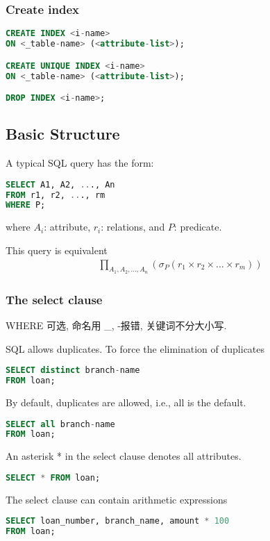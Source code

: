 \subsubsection{Create index}
\begin{lstlisting}[language=sql]
CREATE INDEX <i-name> 
ON <_table-name> (<attribute-list>);

CREATE UNIQUE INDEX <i-name> 
ON <_table-name> (<attribute-list>);

DROP INDEX <i-name>;
\end{lstlisting}

\subsection{Basic Structure}

A typical SQL query has the form:
\begin{lstlisting}[language=sql]
SELECT A1, A2, ..., An
FROM r1, r2, ..., rm
WHERE P;
\end{lstlisting}
where $A_i$: attribute, $r_i$: relations, and $P$: predicate. 

This query is equivalent
\begin{align*}
    \prod_{A_1, A_2, \dots,A_n}\left( \sigma_P(r_1 \times r_2\times \dots \times r_m) \right)
\end{align*}

\subsubsection{The select clause}
WHERE 可选, 命名用 \_, -报错, 关键词不分大小写. 

SQL allows duplicates. To force the elimination of duplicates
\begin{lstlisting}[language=sql]
SELECT distinct branch-name
FROM loan;
\end{lstlisting}
By default, duplicates are allowed, i.e., all is the default.
\begin{lstlisting}[language=sql]
SELECT all branch-name
FROM loan;
\end{lstlisting}

An asterisk * in the select clause denotes all attributes.
\begin{lstlisting}[language=sql]
SELECT * FROM loan;
\end{lstlisting}

The select clause can contain arithmetic expressions
\begin{lstlisting}[language=sql]
SELECT loan_number, branch_name, amount * 100
FROM loan;
\end{lstlisting}

